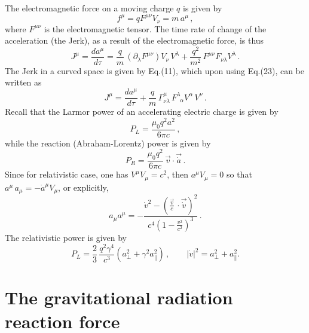 \documentclass[a4]{epl2}
\begin{document}
The electromagnetic force on a moving charge $q$ is given by
\begin{equation}
f^\mu=qF^{\mu\nu}V_\nu=m\,a^\mu\,,
\end{equation}
where $F^{\mu\nu}$ is the electromagnetic tensor.
The time rate of change of the acceleration (the Jerk), as a result of the electromagnetic force, is thus
\begin{equation}
J^\mu=\frac{da^\mu}{d\tau}=\frac{q}{m}\,(\partial_\lambda F^{\mu\nu})V_\nu\,V^\lambda+\frac{q^2}{m^2}\,F^{\mu\nu}F_{\nu\lambda}V^\lambda\,.
\end{equation}
The Jerk in a curved space is given by  Eq.(11), which upon using Eq.(23), can be written as
\begin{equation}
J^\mu=\frac{da^\mu}{d\tau}+\frac{q}{m}\, \Gamma^\mu_{\nu\lambda}\,F^{\lambda}_{\,\,\,\alpha}V^\alpha\,V^\nu\,.
\end{equation}
Recall that the Larmor power of an accelerating electric charge  is given by \textcolor[rgb]{0.00,0.07,1.00}{\cite{larmor}}
\begin{equation}
P_L=\frac{\mu_0q^2a^2}{6\pi c}\,,
\end{equation}
while the reaction (Abraham-Lorentz) power is given by
\begin{equation}
P_R=\frac{\mu_0q^2}{6\pi c}\,\vec{v}\cdot\vec{\dot a}\,.
\end{equation}
Since for relativistic case, one has $V^\mu V_\mu=c^2$, then $a^\mu V_\mu=0$ so that $a^\mu\, a_\mu=-\dot a^\mu V_\mu$, or explicitly,
\begin{equation}
 a_\mu a^\mu=-\frac{\dot v^2-(\frac{\vec{v}}{c}\,\cdot\vec{\dot v})^2}{c^4(1-\frac{v^2}{c^2})^3}\,.
\end{equation}
The relativistic power is given by
$$P_L=\frac{2}{3}\,\frac{q^2\gamma^4}{c^3}(a^2_\bot+\gamma^2a^2_\parallel)\,,\qquad |\dot v|^2=a^2_\bot+a^2_\parallel.$$

\section{\textcolor[rgb]{0.00,0.07,1.00}{The gravitational radiation reaction force}}
\end{document}
